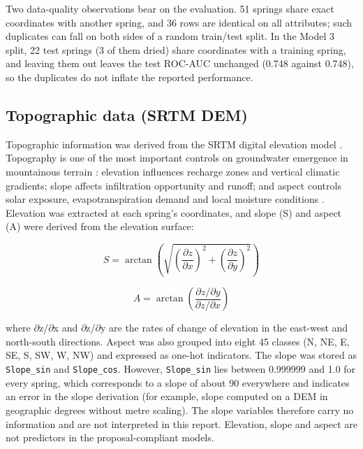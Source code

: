 \documentclass[12pt,a4paper]{article}
\begin{document}
Two data-quality observations bear on the evaluation. 51 springs share exact coordinates with another spring, and 36 rows are identical on all attributes; such duplicates can fall on both sides of a random train/test split. In the Model 3 split, 22 test springs (3 of them dried) share coordinates with a training spring, and leaving them out leaves the test ROC-AUC unchanged (0.748 against 0.748), so the duplicates do not inflate the reported performance.

\subsection{Topographic data (SRTM DEM)}\label{sec:topo}

Topographic information was derived from the SRTM digital elevation model \citep{farr2000,yang2011}. Topography is one of the most important controls on groundwater emergence in mountainous terrain \citep{forster1988,condon2015,broxton2009}: elevation influences recharge zones and vertical climatic gradients; slope affects infiltration opportunity and runoff; and aspect controls solar exposure, evapotranspiration demand and local moisture conditions \citep{gutierrez2013}. Elevation was extracted at each spring's coordinates, and slope (S) and aspect (A) were derived from the elevation surface:

\begin{equation}
S = \arctan\left(\sqrt{\left(\frac{\partial z}{\partial x}\right)^2 + \left(\frac{\partial z}{\partial y}\right)^2}\right)
\end{equation}

\begin{equation}
A = \arctan\left(\frac{\partial z/\partial y}{\partial z/\partial x}\right)
\end{equation}

where $\partial$z/$\partial$x and $\partial$z/$\partial$y are the rates of change of elevation in the east-west and north-south directions. Aspect was also grouped into eight 45\textdegree{} classes (N, NE, E, SE, S, SW, W, NW) and expressed as one-hot indicators. The slope was stored as \texttt{Slope\_\allowbreak{}sin} and \texttt{Slope\_\allowbreak{}cos}. However, \texttt{Slope\_\allowbreak{}sin} lies between 0.999999 and 1.0 for every spring, which corresponds to a slope of about 90\textdegree{} everywhere and indicates an error in the slope derivation (for example, slope computed on a DEM in geographic degrees without metre scaling). The slope variables therefore carry no information and are not interpreted in this report. Elevation, slope and aspect are not predictors in the proposal-compliant models.
\end{document}
